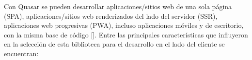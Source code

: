


  

Con Quasar se pueden desarrollar aplicaciones/sitios web de una sola página (SPA),
aplicaciones/sitios web renderizados del lado del servidor (SSR),
aplicaciones web progresivas (PWA), incluso aplicaciones móviles y de 
escritorio, con la misma base de código [\cite{quasar}].
Entre las principales características que influyeron en la selección de esta biblioteca 
para el desarrollo en el lado del cliente se encuentran: 


